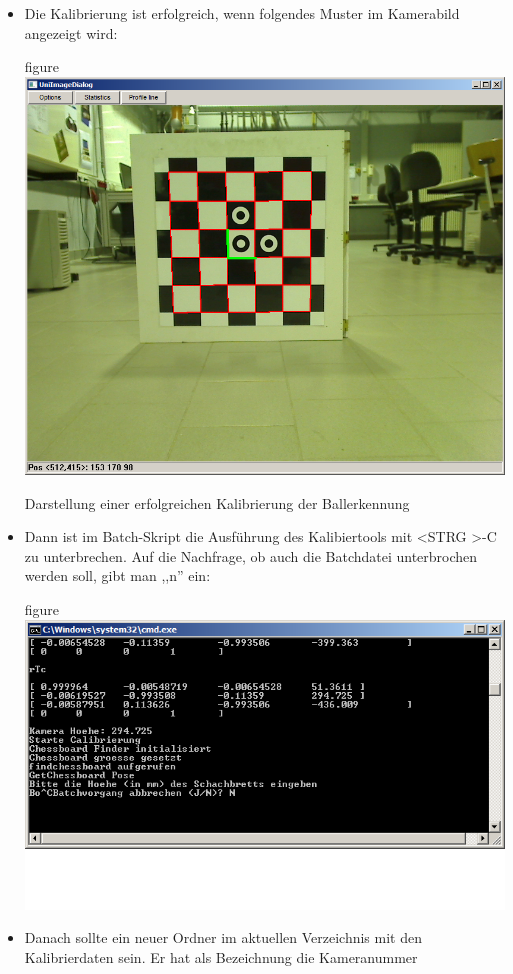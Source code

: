\begin{itemize}
\begin{nofloat}{figure}
    \caption{Abfrage der zur Kalibrierung nötigen Parameter}
  \end{nofloat}\newpage
\item Die Kalibrierung ist erfolgreich, wenn folgendes Muster im
  Kamerabild angezeigt wird:
  \begin{nofloat}{figure}\centering
    \includegraphics[width=0.7\linewidth]{bilder/calibrate2}
    \caption{Darstellung einer erfolgreichen Kalibrierung der Ballerkennung}
  \end{nofloat}
\item Dann ist im Batch-Skript die Ausführung
  des Kalibiertools mit \textless STRG \textgreater -C zu unterbrechen. Auf die Nachfrage,
  ob auch die Batchdatei unterbrochen werden soll, gibt man ,,n'' ein:
 \begin{nofloat}{figure}\centering
    \includegraphics[width=\linewidth]{bilder/calibrate3}
  \end{nofloat}\newpage
\item Danach sollte ein neuer Ordner im aktuellen Verzeichnis mit den
  Kalibrierdaten sein. Er hat als Bezeichnung die Kameranummer

\end{itemize}
